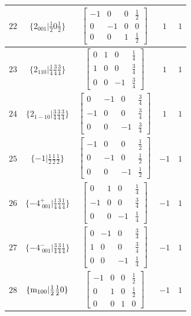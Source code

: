 \documentclass[fleqn,8pt]{jsarticle}
\begin{document}
\begin{longtable}{ccccc}
$ 22 $ & $ \{2{}_{001}|\frac{1}{2} 0 \frac{1}{2}\} $ & $ \begin{bmatrix} -1 & 0 & 0 & \frac{1}{2} \\ 0 & -1 & 0 & 0 \\ 0 & 0 & 1 & \frac{1}{2} \end{bmatrix} $ & $ 1 $ & $ 1 $ \\ \hline
$ 23 $ & $ \{2{}_{110}|\frac{1}{4} \frac{3}{4} \frac{3}{4}\} $ & $ \begin{bmatrix} 0 & 1 & 0 & \frac{1}{4} \\ 1 & 0 & 0 & \frac{3}{4} \\ 0 & 0 & -1 & \frac{3}{4} \end{bmatrix} $ & $ 1 $ & $ 1 $ \\ \hline
$ 24 $ & $ \{2{}_{1-10}|\frac{3}{4} \frac{3}{4} \frac{3}{4}\} $ & $ \begin{bmatrix} 0 & -1 & 0 & \frac{3}{4} \\ -1 & 0 & 0 & \frac{3}{4} \\ 0 & 0 & -1 & \frac{3}{4} \end{bmatrix} $ & $ 1 $ & $ 1 $ \\ \hline
$ 25 $ & $ \{-1|\frac{1}{2} \frac{1}{2} \frac{1}{2}\} $ & $ \begin{bmatrix} -1 & 0 & 0 & \frac{1}{2} \\ 0 & -1 & 0 & \frac{1}{2} \\ 0 & 0 & -1 & \frac{1}{2} \end{bmatrix} $ & $ -1 $ & $ 1 $ \\ \hline
$ 26 $ & $ \{-4^{+}_{\,\,001}|\frac{1}{4} \frac{3}{4} \frac{1}{4}\} $ & $ \begin{bmatrix} 0 & 1 & 0 & \frac{1}{4} \\ -1 & 0 & 0 & \frac{3}{4} \\ 0 & 0 & -1 & \frac{1}{4} \end{bmatrix} $ & $ -1 $ & $ 1 $ \\ \hline
$ 27 $ & $ \{-4^{-}_{\,\,001}|\frac{3}{4} \frac{3}{4} \frac{1}{4}\} $ & $ \begin{bmatrix} 0 & -1 & 0 & \frac{3}{4} \\ 1 & 0 & 0 & \frac{3}{4} \\ 0 & 0 & -1 & \frac{1}{4} \end{bmatrix} $ & $ -1 $ & $ 1 $ \\ \hline
$ 28 $ & $ \{{\rm m}_{100}|\frac{1}{2} \frac{1}{2} 0\} $ & $ \begin{bmatrix} -1 & 0 & 0 & \frac{1}{2} \\ 0 & 1 & 0 & \frac{1}{2} \\ 0 & 0 & 1 & 0 \end{bmatrix} $ & $ -1 $ & $ 1 $ \\ \hline

\end{longtable}
\end{document}
